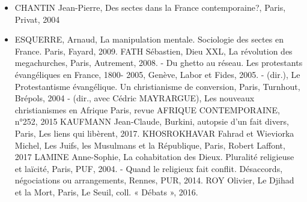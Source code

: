 \begin{itemize}
\item  CHANTIN Jean-Pierre, Des sectes dans la France contemporaine?, Paris, Privat, 2004 
\item ESQUERRE, Arnaud, La manipulation mentale. Sociologie des sectes en France.  Paris, Fayard, 2009. FATH Sébastien, Dieu XXL, La révolution des megachurches, Paris, Autrement, 2008. - Du ghetto au réseau. Les protestants évangéliques en France, 1800- 2005, Genève, Labor et Fides, 2005. -  (dir.), Le Protestantisme évangélique. Un christianisme de conversion,  Paris, Turnhout, Brépols, 2004 - (dir., avec Cédric MAYRARGUE), Les nouveaux christianismes en Afrique Paris, revue AFRIQUE CONTEMPORAINE, n°252, 2015 KAUFMANN Jean-Claude, Burkini, autopsie d'un fait divers, Paris, Les liens qui libèrent,  2017. KHOSROKHAVAR Fahrad et Wieviorka Michel, Les Juifs, les Musulmans et la République,  Paris, Robert Laffont, 2017  LAMINE Anne-Sophie, La cohabitation des Dieux. Pluralité religieuse et laïcité, Paris,  PUF, 2004.  - Quand le religieux fait conflit. Désaccords, négociations ou arrangements, Rennes, PUR, 2014. ROY Olivier, Le Djihad et la Mort, Paris, Le Seuil, coll. « Débats », 2016.  
\end{itemize}



